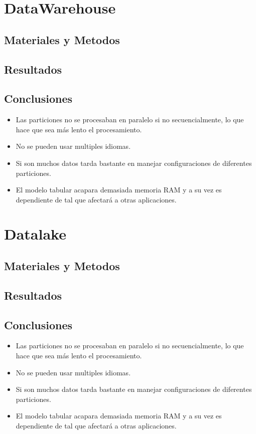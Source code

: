 \documentclass[preprint,12pt]{elsarticle}
\begin{document}
\section{DataWarehouse}

\subsection{Materiales y Metodos}

\subsection{Resultados}

\subsection{Conclusiones}

\begin{itemize}
	\item Las particiones no se procesaban en paralelo si no secuencialmente, lo que hace que sea más lento el procesamiento.
	\item No se pueden usar multiples idiomas.
	\item Si son muchos datos tarda bastante en manejar configuraciones de diferentes particiones.
	\item El modelo tabular acapara demasiada memoria RAM y a su vez es dependiente de tal que afectará a otras aplicaciones.
\end{itemize}

\section{Datalake}

\subsection{Materiales y Metodos}

\subsection{Resultados}

\subsection{Conclusiones}

\begin{itemize}
	\item Las particiones no se procesaban en paralelo si no secuencialmente, lo que hace que sea más lento el procesamiento.
	\item No se pueden usar multiples idiomas.
	\item Si son muchos datos tarda bastante en manejar configuraciones de diferentes particiones.
	\item El modelo tabular acapara demasiada memoria RAM y a su vez es dependiente de tal que afectará a otras aplicaciones.
\end{itemize}
\end{document}

